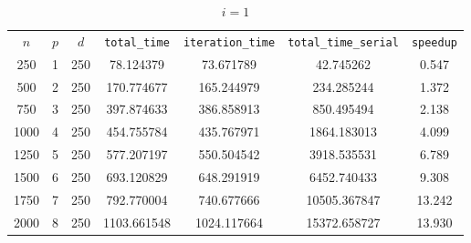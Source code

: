 \documentclass[
ngerman,
subtask=ruled %
]{tudaexercise}
\begin{document}
\begin{table}[htbp]
	\centering
	\caption{$i=1$}
	\begin{tabular}{ccccccc}
		
		$n$ & $p$ & $d$ & \texttt{total\_time} & \texttt{iteration\_time} & \texttt{total\_time\_serial} & \texttt{speedup} \\ 
		250 & 1   & 250 & 78.124379            & 73.671789               & 42.745262                  & 0.547           \\
		500 & 2   & 250 & 170.774677           & 165.244979              & 234.285244                 & 1.372           \\
		750 & 3   & 250 & 397.874633           & 386.858913              & 850.495494                 & 2.138           \\
		1000 & 4  & 250 & 454.755784           & 435.767971              & 1864.183013                & 4.099           \\
		1250 & 5  & 250 & 577.207197           & 550.504542              & 3918.535531                & 6.789           \\
		1500 & 6  & 250 & 693.120829           & 648.291919              & 6452.740433                & 9.308           \\
		1750 & 7  & 250 & 792.770004           & 740.677666              & 10505.367847               & 13.242          \\
		2000 & 8  & 250 & 1103.661548          & 1024.117664             & 15372.658727               & 13.930          \\ 
	\end{tabular}
\end{table}
\end{document}
